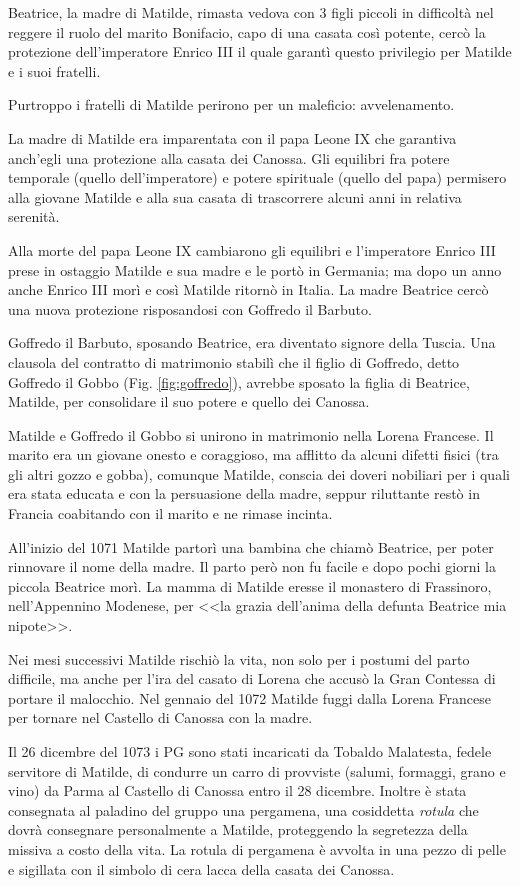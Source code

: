 \documentclass[letterpaper,twocolumn,openany,nodeprecatedcode]{dndbook}
\begin{document}
Beatrice, la madre di Matilde, rimasta vedova con 3 figli piccoli in difficoltà nel reggere il ruolo del marito Bonifacio, capo di una casata così potente, cercò la protezione dell'imperatore Enrico III il quale garantì questo privilegio per Matilde e i suoi fratelli.

Purtroppo i fratelli di Matilde perirono per un maleficio: avvelenamento.

La madre di Matilde era imparentata con il papa Leone IX che garantiva anch'egli una protezione alla casata dei Canossa. Gli equilibri fra potere temporale (quello dell'imperatore) e potere spirituale (quello del papa) permisero alla giovane Matilde e alla sua casata di trascorrere alcuni anni in relativa serenità.

Alla morte del papa Leone IX cambiarono gli equilibri e l'imperatore Enrico III prese in ostaggio Matilde e sua madre e le portò in Germania; ma dopo un anno anche Enrico III morì e così Matilde ritornò in Italia. La madre Beatrice cercò una nuova protezione risposandosi con Goffredo il Barbuto.

Goffredo il Barbuto, sposando Beatrice, era diventato signore della Tuscia. Una clausola del contratto di matrimonio stabilì che il figlio di Goffredo, detto Goffredo il Gobbo (Fig. \ref{fig:goffredo}), avrebbe sposato la figlia di Beatrice, Matilde, per consolidare il suo potere e quello dei Canossa.

Matilde e Goffredo il Gobbo si unirono in matrimonio nella Lorena Francese. Il marito era un giovane onesto e coraggioso, ma afflitto da alcuni difetti fisici (tra gli altri gozzo e gobba), comunque Matilde, conscia dei doveri nobiliari per i quali era stata educata e con la persuasione della madre, seppur riluttante restò in Francia coabitando con il marito e ne rimase incinta.

All'inizio del 1071 Matilde partorì una bambina che chiamò Beatrice, per poter rinnovare il nome della madre. Il parto però non fu facile e dopo pochi giorni la piccola Beatrice morì. La mamma di Matilde eresse il monastero di Frassinoro, nell'Appennino Modenese, per <<la grazia dell'anima della defunta Beatrice mia nipote>>.

Nei mesi successivi Matilde rischiò la vita, non solo per i postumi del parto difficile, ma anche per l'ira del casato di Lorena che accusò la Gran Contessa di portare il malocchio. Nel gennaio del 1072 Matilde fuggi dalla Lorena Francese per tornare nel Castello di Canossa con la madre.

Il 26 dicembre del 1073 i PG sono stati incaricati da Tobaldo Malatesta, fedele servitore di Matilde, di condurre un carro di provviste (salumi, formaggi, grano e vino) da Parma al Castello di Canossa entro il 28 dicembre. Inoltre è stata consegnata al paladino del gruppo  una pergamena, una cosiddetta \textit{rotula} che dovrà consegnare personalmente a Matilde, proteggendo la segretezza della missiva a costo della vita. La rotula di pergamena è avvolta in una pezzo di pelle e sigillata con il simbolo di cera lacca della casata dei Canossa. 
\end{document}
